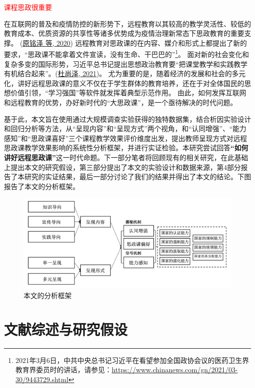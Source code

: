 \documentclass[
  12pt,
]{ctexart}
\begin{document}
\textcolor{red}{课程思政很重要}

在互联网的普及和疫情防控的新形势下，远程教育以其较高的教学灵活性、较低的教育成本、优质资源的共享性等诸多优势成为疫情治理新常态下思政教育的重要支撑。 (\protect\hyperlink{ref-YuanMingZeEtAl2020a}{原铭泽 等, 2020})
远程教育对思政课的在内容、媒介和形式上都提出了新的要求，``思政课不能拿着文件宣读，没有生命、干巴巴的''\footnote{2021年3月6日，中共中央总书记习近平在看望参加全国政协会议的医药卫生界教育界委员时的讲话，请参见：\url{https://www.chinanews.com/gn/2021/03-30/9443729.shtml}}。
面对新的社会变化和复杂多变的国际形势，习近平总书记提出思想政治教育要``把课堂教学和实践教学有机结合起来''。(\protect\hyperlink{ref-DuShangZe2021}{杜尚泽, 2021})。
尤为重要的是，随着经济的发展和社会的多元化，讲好远程思政课的意义不仅在于学生群体的教育培养，还在于对全体国民的思想价值引领，``学习强国''等软件就发挥着典型示范作用。
由此，如何发挥互联网和远程教育的优势，办好新时代的``大思政课''，是一个亟待解决的时代问题。

基于此，本文旨在使用通过大规模调查实验获得的独特数据集，结合析因实验设计和回归分析等方法，从``呈现内容''和``呈现方式''两个视角，和``认同增强''、``能力感知''和``思政课喜好''三个课程教学效果评价维度出发，提出教师呈现方式对远程思政课教学效果影响的系统性分析框架，并进行实证检验。本研究尝试回答\textbf{``如何讲好远程思政课''}这一时代命题。下一部分笔者将回顾现有的相关研究，在此基础上提出本文的研究假设，第三部分提出了本文的实验设计和数据来源，第4部分报告了本研究的实证结果，最后一部分讨论了我们的结果并得出了本文的结论。下图报告了本文的分析框架。

\begin{figure}[h]
\includegraphics[width=1\linewidth]{../figures/frame_distance} \caption{本文的分析框架}\label{fig:unnamed-chunk-1}
\end{figure}

\hypertarget{ux6587ux732eux7efcux8ff0ux4e0eux7814ux7a76ux5047ux8bbe}{%
\section{文献综述与研究假设}\label{ux6587ux732eux7efcux8ff0ux4e0eux7814ux7a76ux5047ux8bbe}}
\end{document}
